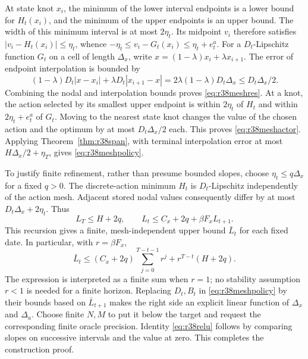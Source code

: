 At state knot $x_i$, the minimum of the lower interval endpoints is a lower
bound for $H_t(x_i)$, and the minimum of the upper endpoints is an upper
bound. The width of this minimum interval is at most $2\eta_t$. Its midpoint
$v_i$ therefore satisfies $|v_i-H_t(x_i)|\leq\eta_t$, whence
$-\eta_t\leq v_i-G_t(x_i)\leq\eta_t+e_t^a$.
For a $D_t$-Lipschitz function $G_t$ on a cell of length $\Delta_x$, write
$x=(1-\lambda)x_i+\lambda x_{i+1}$. The error of endpoint interpolation is
bounded by
\[
 (1-\lambda)D_t|x-x_i|+\lambda D_t|x_{i+1}-x|
 =2\lambda(1-\lambda)D_t\Delta_x\leq D_t\Delta_x/2.
\]
Combining the nodal and interpolation bounds proves
\eqref{eq:r38meshres}. At a knot, the action selected by its smallest upper
endpoint is within $2\eta_t$ of $H_t$ and within $2\eta_t+e_t^a$ of $G_t$.
Moving to the nearest state knot changes the value of the chosen action and
the optimum by at most $D_t\Delta_x/2$ each. This proves
\eqref{eq:r38meshactor}. Applying Theorem~\ref{thm:r38span}, with terminal
interpolation error at most $H\Delta_x/2+\eta_T$, gives
\eqref{eq:r38meshpolicy}.

To justify finite refinement, rather than presume bounded slopes, choose
$\eta_t\leq q\Delta_x$ for a fixed $q>0$. The discrete-action minimum
$H_t$ is $D_t$-Lipschitz independently of the action mesh. Adjacent stored
nodal values consequently differ by at most
$D_t\Delta_x+2\eta_t$. Thus
\[
 L_T\leq H+2q,\qquad
 L_t\leq C_x+2q+\beta F_xL_{t+1}.
\]
This recursion gives a finite, mesh-independent upper bound $\bar L_t$ for
each fixed date. In particular, with $r=\beta F_x$,
\[
 \bar L_t\leq (C_x+2q)\sum_{j=0}^{T-t-1}r^j+r^{T-t}(H+2q).
\]
The expression is interpreted as a finite sum when $r=1$; no stability
assumption $r<1$ is needed for a finite horizon. Replacing $D_t,B_t$ in
\eqref{eq:r38meshpolicy} by their bounds based on $\bar L_{t+1}$ makes the
right side an explicit linear function of $\Delta_x$ and $\Delta_a$.
Choose finite $N,M$ to put it below the target and request the corresponding
finite oracle precision. Identity \eqref{eq:r38relu} follows by comparing
slopes on successive intervals and the value at zero. This completes the
construction proof.

